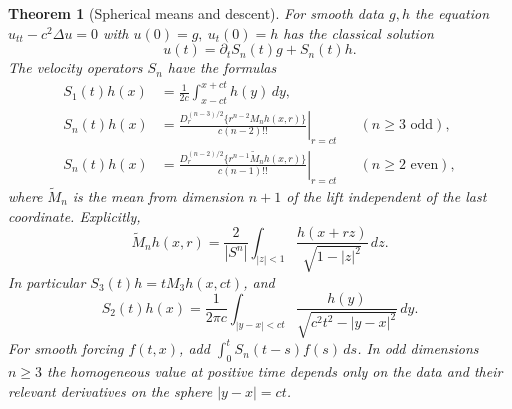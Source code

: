 \documentclass[11pt,oneside,openany]{book}
\theoremstyle{plain}
\newtheorem{theorem}{Theorem}[chapter]
\theoremstyle{definition}
\theoremstyle{remark}
\begin{document}
\begin{theorem}[Spherical means and descent]\label{thm:pde-classical-wave}
For smooth data \(g,h\) the equation \(u_{tt}-c^2\Delta u=0\)
with \(u(0)=g,\ u_t(0)=h\) has the classical solution
\[
 u(t)=\partial_t S_n(t)g+S_n(t)h .
\]
The velocity operators \(S_n\) have the formulas
\begin{align*}
 S_1(t)h(x)&=\frac1{2c}\int_{x-ct}^{x+ct}h(y)\,dy,\\
 S_n(t)h(x)&=\left.
     \frac{D_r^{(n-3)/2}\{r^{n-2}M_n h(x,r)\}}
          {c(n-2)!!}\right|_{r=ct}
                 &&(n\geq3\text{ odd}),\\
 S_n(t)h(x)&=\left.
     \frac{D_r^{(n-2)/2}\{r^{n-1}\widetilde M_n h(x,r)\}}
          {c(n-1)!!}\right|_{r=ct}
                 &&(n\geq2\text{ even}),
\end{align*}
where \(\widetilde M_n\) is the mean from dimension \(n+1\) of
the lift independent of the last coordinate. Explicitly,
\[
 \widetilde M_n h(x,r)=\frac{2}{|S^n|}
       \int_{|z|<1}\frac{h(x+rz)}{\sqrt{1-|z|^2}}\,dz .
\]
In particular \(S_3(t)h=t M_3h(x,ct)\), and
\[
 S_2(t)h(x)=\frac{1}{2\pi c}
       \int_{|y-x|<ct}\frac{h(y)}{\sqrt{c^2t^2-|y-x|^2}}\,dy .
\]
For smooth forcing \(f(t,x)\), add \(\int_0^t S_n(t-s)f(s)\,ds\).
In odd dimensions \(n\geq3\) the homogeneous value at positive time
depends only on the data and their relevant derivatives on the
sphere \(|y-x|=ct\).
\end{theorem}
\end{document}
